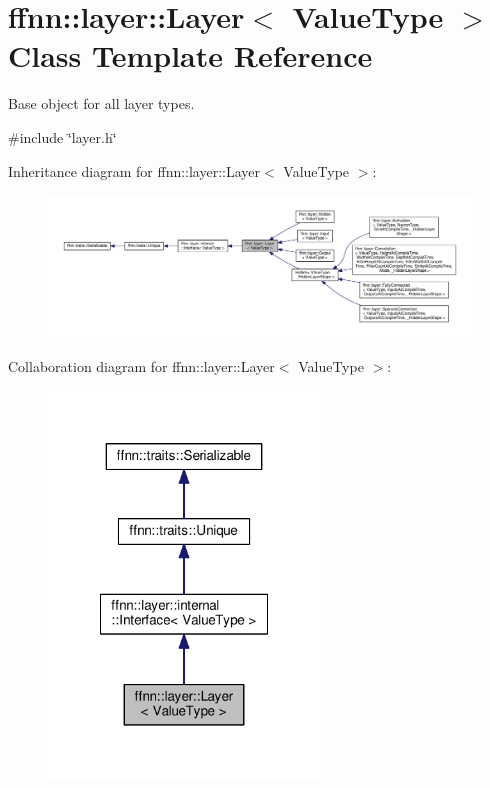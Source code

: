 \hypertarget{classffnn_1_1layer_1_1_layer}{\section{ffnn\-:\-:layer\-:\-:Layer$<$ Value\-Type $>$ Class Template Reference}
\label{classffnn_1_1layer_1_1_layer}
}


Base object for all layer types.  




{\ttfamily \#include \char`\"{}layer.\-h\char`\"{}}



Inheritance diagram for ffnn\-:\-:layer\-:\-:Layer$<$ Value\-Type $>$\-:\nopagebreak
\begin{figure}[H]
\begin{center}
\leavevmode
\includegraphics[width=350pt]{classffnn_1_1layer_1_1_layer__inherit__graph}
\end{center}
\end{figure}


Collaboration diagram for ffnn\-:\-:layer\-:\-:Layer$<$ Value\-Type $>$\-:\nopagebreak
\begin{figure}[H]
\begin{center}
\leavevmode
\includegraphics[width=204pt]{classffnn_1_1layer_1_1_layer__coll__graph}
\end{center}
\end{figure}
